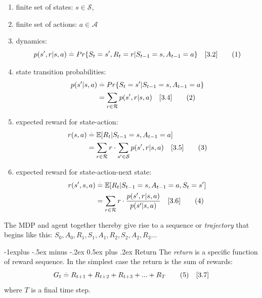 \documentclass[10pt,landscape]{article}
\makeatletter
\renewcommand{\subsection}{\@startsection{subsection}{2}{0mm}%
                                {-1explus -.5ex minus -.2ex}%
                                {0.5ex plus .2ex}%
                                {\normalfont\normalsize\bfseries}}
\newcommand\numberthis{\addtocounter{equation}{1}\tag{\theequation}}
\makeatother
\begin{document}
\begin{multicols}{3}
\begin{enumerate}
    \item finite set of states:  $s \in \mathcal{S}$,
    \item finite set of actions: $a \in \mathcal{A}$
    \item dynamics:
\begin{equation}
p(s', r | s, a) \stackrel{.}{=} Pr \{S_{t} = s', R_{t} = r | \\ S_{t-1} = s, A_{t-1} = a \} \quad [3.2] \numberthis
\end{equation}
    \item state transition probabilities: 
\begin{align*}
p(s' | s, a) & \stackrel{.}{=} Pr \{S_{t} = s' | S_{t-1} = s, A_{t-1} = a \} \\
& = \sum_{r \in \mathcal{R}} p(s', r | s, a) \quad [3.4]  \numberthis
\end{align*}
    \item expected reward for state-action:
\begin{align*}
r(s, a) & \stackrel{.}{=} \mathbb{E}[ R_{t} | S_{t-1} = s, A_{t-1} = a ] \\
 & = \sum_{r \in \mathcal{R}} r \cdot \sum_{s' \in \mathcal{S}} p(s', r | s, a) \quad [3.5]  \numberthis
\end{align*}
    \item expected reward for state-action-next state: 
\begin{align*}
r(s',s, a) & \stackrel{.}{=} \mathbb{E}[ R_{t} | S_{t-1} = s, A_{t-1} = a, S_{t} = s' ] \\
& = \sum_{r \in \mathcal{R}} r \cdot \frac{p(s', r | s, a)}{p(s' | s,a)} \quad [3.6] \numberthis
\end{align*}
\end{enumerate}

The MDP and agent together thereby give rise to a sequence or \emph{trajectory} that begins like this:
$S_0,A_0,R_1,S_1,A_1,R_2,S_2,A_2,R_3...$

\subsection{Return}
The \emph{return} is a specific function of reward sequence. In the simplest case the return is the sum of rewards: 
\begin{equation}
G_t \stackrel{.}{=} R_{t+1} + R_{t+2} + R_{t+3} + ... +  R_{T} \numberthis \label{eq:return_1} \quad [3.7]
\end{equation}
where $T$ is a final time step. \\


\end{multicols}
\end{document}
